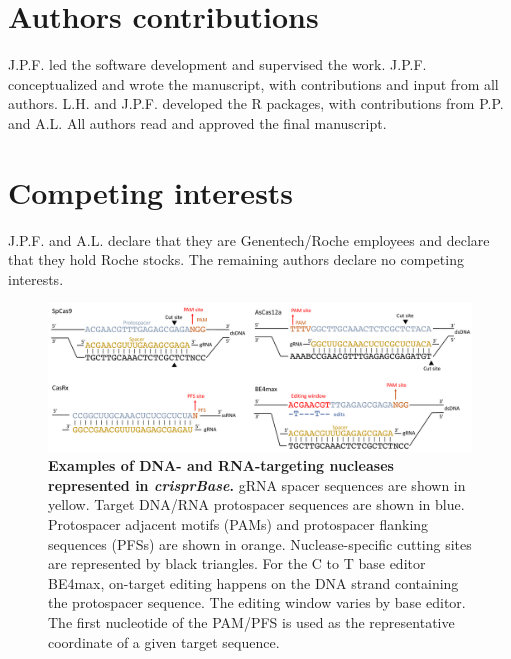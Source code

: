 \documentclass[pdftex,english,10pt]{article}
\begin{document}
{\section*{Authors contributions}

J.P.F. led the software development and supervised the work.
J.P.F. conceptualized and wrote the manuscript, with contributions and input from all authors. 
L.H. and J.P.F. developed the R packages, with contributions from P.P. and A.L.
All authors read and approved the final manuscript.

\section*{Competing interests}

J.P.F. and A.L. declare that they are Genentech/Roche employees and declare that they hold Roche stocks. 
The remaining authors declare no competing interests.


\clearpage

\begin{figure}[!h]
\centering
\includegraphics[width=1\textwidth]{Figure1.pdf}
  \caption{\textbf{Examples of DNA- and RNA-targeting nucleases represented in \textit{crisprBase}.} gRNA spacer sequences are shown in yellow. Target DNA/RNA protospacer sequences are shown in blue. Protospacer adjacent motifs (PAMs) and protospacer flanking sequences (PFSs) are shown in orange. Nuclease-specific cutting sites are represented by black triangles. For the C to T base editor BE4max, on-target editing happens on the DNA strand containing the protospacer sequence. The editing window varies by base editor. The first nucleotide of the PAM/PFS is used as the representative coordinate of a given target sequence. 
  }
  \label{fig:nucleases}
\end{figure}



}
\end{document}
